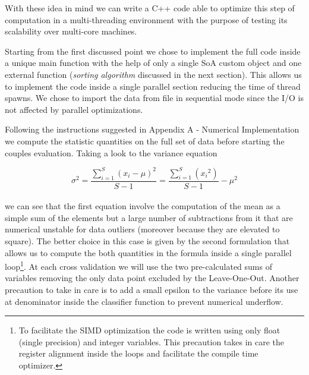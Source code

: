 \documentclass{standalone}
\begin{document}
With these idea in mind we can write a C++ code able to optimize this step of computation in a multi-threading environment with the purpose of testing its scalability over multi-core machines.

Starting from the first discussed point we chose to implement the full code inside a unique main function with the help of only a single SoA custom object and one external function (\emph{sorting algorithm} discussed in the next section).
This allows us to implement the code inside a single parallel section reducing the time of thread spawns.
We chose to import the data from file in sequential mode since the I/O is not affected by parallel optimizations.

Following the instructions suggested in Appendix A - Numerical Implementation we compute the statistic quantities on the full set of data before starting the couples evaluation.
Taking a look to the variance equation

$$
\sigma^2 = \frac{\sum_{i=1}^{S}(x_i - \mu)^2} {S - 1} = \frac{\sum_{i=1}^{S}({x_i}^2)} {S - 1} - \mu^2
$$
\\
we can see that the first equation involve the computation of the mean as a simple sum of the elements but a large number of subtractions from it that are numerical unstable for data outliers (moreover because they are elevated to square).
The better choice in this case is given by the second formulation that allows us to compute the both quantities in the formula inside a single parallel loop\footnote{
  To facilitate the SIMD optimization the code is written using only float (single precision) and integer variables.
  This precaution takes in care the register alignment inside the loops and facilitate the compile time optimizer.
}.
At each cross validation we will use the two pre-calculated sums of variables removing the only data point excluded by the Leave-One-Out.
Another precaution to take in care is to add a small epsilon to the variance before its use at denominator inside the classifier function to prevent numerical underflow.
\end{document}
